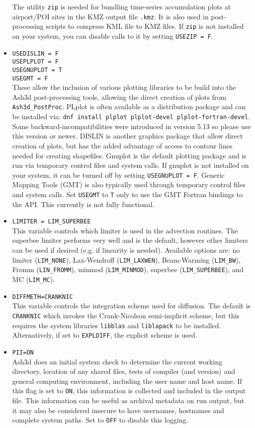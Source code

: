 \begin{itemize}
The utility \texttt{zip} is needed for bundling time-series accumulation plots
at airport/POI sites in the KMZ output file \texttt{.kmz}. It is also used in
post-processing scripts to compress KML file to KMZ files.
If \texttt{zip} is not
installed on your system, you can disable calls to it by setting \texttt{USEZIP = F}.
 \item \texttt{USEDISLIN = F}\\
 \texttt{USEPLPLOT = F}\\
 \texttt{USEGNUPLOT = T}\\
 \texttt{USEGMT = F}\\
 These allow the inclusion of various plotting libraries to be build into the Ash3d
post-processing tools, allowing the direct creation of plots from \texttt{Ash3d\_PostProc}.
PLplot is often available as a distribution package and can be installed via:
\texttt{dnf install plplot plplot-devel plplot-fortran-devel}. Some backward-incompatibilities
were introduced in version 5.13 so please use this version or newer. DISLIN is another
graphics package that allow direct creation of plots, but has the added advantage of
access to contour lines needed for creating shapefiles. Gnuplot is the default plotting
package and is run via temporary control files and system calls. If gnuplot is not installed
on your system, it can be turned off by setting \texttt{USEGNUPLOT = F}.
Generic Mapping Tools (GMT)
is also typically used through temporary control files and system calls. Set \texttt{USEGMT}
to \texttt{T} only to use the GMT Fortran bindings to the API. This currently is not
fully functional.
 \item \texttt{LIMITER = LIM\_SUPERBEE}\\
This variable controls which limiter is used in the advection routines. The
superbee limiter performs very well and is the default, however other limiters
can be used if desired (e.g. if linearity is needed). Available options are:
no limiter (\texttt{LIM\_NONE}), Lax-Wendroff (\texttt{LIM\_LAXWEN}),
Beam-Warming (\texttt{LIM\_BW}), Fromm (\texttt{LIN\_FROMM}), 
minmod (\texttt{LIM\_MINMOD}), superbee (\texttt{LIM\_SUPERBEE}),
and MC (\texttt{LIM\_MC}).
 \item \texttt{DIFFMETH=CRANKNIC}\\
This variable controls the integration scheme used for diffusion. The default
is \texttt{CRANKNIC} which invokes the Crank-Nicolson semi-implicit scheme, but
this requires the system libraries \texttt{libblas} and \texttt{liblapack} to be installed.
Alternatively, if set to \texttt{EXPLDIFF}, the explicit scheme is used.
 \item \texttt{PII=ON}\\
Ash3d does an initial system check to determine the current working directory, location
of any shared files, tests of compiler (and version) and general computing
environment, including the user name and host name. If this flag is set to \texttt{ON}, this
information is collected and included in the output file. This information
can be useful as archival metadata on run output, but it may also be considered insecure
to have usernames, hostnames and complete system paths. Set to \texttt{OFF} to
disable this logging.
\end{itemize}

